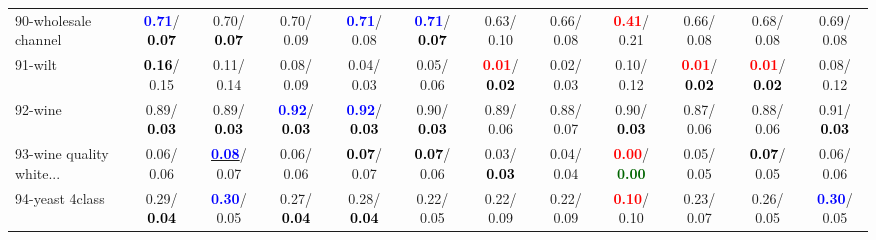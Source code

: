 \begin{table}[h]
\begin{center}
{\begin{tabular}{lc|c|c|c|c|c|c|c|c|c|c}
90-wholesale channel & \textcolor{blue}{\textbf{  0.71}}/\textcolor{black}{\textbf{  0.07}} &   0.70/\textcolor{black}{\textbf{  0.07}} &   0.70/  0.09 & \textcolor{blue}{\textbf{  0.71}}/  0.08 & \textcolor{blue}{\textbf{  0.71}}/\textcolor{black}{\textbf{  0.07}} &   0.63/  0.10 &   0.66/  0.08 & \textcolor{red}{\textbf{  0.41}}/  0.21 &   0.66/  0.08 &   0.68/  0.08 &   0.69/  0.08 \\
91-wilt & \textcolor{black}{\textbf{  0.16}}/  0.15 &   0.11/  0.14 &   0.08/  0.09 &   0.04/  0.03 &   0.05/  0.06 & \textcolor{red}{\textbf{  0.01}}/\textcolor{black}{\textbf{  0.02}} &   0.02/  0.03 &   0.10/  0.12 & \textcolor{red}{\textbf{  0.01}}/\textcolor{black}{\textbf{  0.02}} & \textcolor{red}{\textbf{  0.01}}/\textcolor{black}{\textbf{  0.02}} &   0.08/  0.12 \\
92-wine &   0.89/\textcolor{black}{\textbf{  0.03}} &   0.89/\textcolor{black}{\textbf{  0.03}} & \textcolor{blue}{\textbf{  0.92}}/\textcolor{black}{\textbf{  0.03}} & \textcolor{blue}{\textbf{  0.92}}/\textcolor{black}{\textbf{  0.03}} &   0.90/\textcolor{black}{\textbf{  0.03}} &   0.89/  0.06 &   0.88/  0.07 &   0.90/\textcolor{black}{\textbf{  0.03}} &   0.87/  0.06 &   0.88/  0.06 &   0.91/\textcolor{black}{\textbf{  0.03}} \\ \hline
93-wine quality white... &   0.06/  0.06 & \underline{\textcolor{blue}{\textbf{  0.08}}}/  0.07 &   0.06/  0.06 & \textcolor{black}{\textbf{  0.07}}/  0.07 & \textcolor{black}{\textbf{  0.07}}/  0.06 &   0.03/\textcolor{black}{\textbf{  0.03}} &   0.04/  0.04 & \textcolor{red}{\textbf{  0.00}}/\textcolor{darkgreen}{\textbf{  0.00}} &   0.05/  0.05 & \textcolor{black}{\textbf{  0.07}}/  0.05 &   0.06/  0.06 \\
94-yeast 4class &   0.29/\textcolor{black}{\textbf{  0.04}} & \textcolor{blue}{\textbf{  0.30}}/  0.05 &   0.27/\textcolor{black}{\textbf{  0.04}} &   0.28/\textcolor{black}{\textbf{  0.04}} &   0.22/  0.05 &   0.22/  0.09 &   0.22/  0.09 & \textcolor{red}{\textbf{  0.10}}/  0.10 &   0.23/  0.07 &   0.26/  0.05 & \textcolor{blue}{\textbf{  0.30}}/  0.05 \\\end{tabular}}\label{stratsALCKappa2aVFDTRedux}
\end{center}
\end{table}
